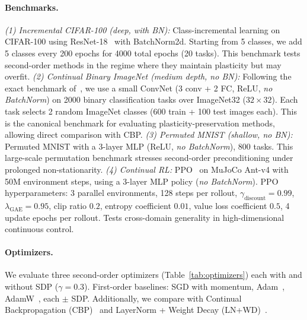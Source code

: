 \documentclass{article}
\begin{document}
\paragraph{Benchmarks.}
\emph{(1) Incremental CIFAR-100 (deep, with BN):} Class-incremental learning on CIFAR-100 using ResNet-18~\citep{he2016deep} with BatchNorm2d. Starting from 5 classes, we add 5 classes every 200 epochs for 4000 total epochs (20 tasks). This benchmark tests second-order methods in the regime where they maintain plasticity but may overfit.
\emph{(2) Continual Binary ImageNet (medium depth, no BN):} Following the exact benchmark of~\citet{dohare2024loss}, we use a small ConvNet (3 conv + 2 FC, ReLU, \emph{no BatchNorm}) on 2000 binary classification tasks over ImageNet32 ($32{\times}32$). Each task selects 2 random ImageNet classes (600 train + 100 test images each). This is the canonical benchmark for evaluating plasticity-preservation methods, allowing direct comparison with CBP.
\emph{(3) Permuted MNIST (shallow, no BN):} Permuted MNIST with a 3-layer MLP (ReLU, \emph{no BatchNorm}), 800 tasks. This large-scale permutation benchmark stresses second-order preconditioning under prolonged non-stationarity.
\emph{(4) Continual RL:} PPO~\citep{schulman2017proximal} on MuJoCo Ant-v4 with 50M environment steps, using a 3-layer MLP policy (\emph{no BatchNorm}). PPO hyperparameters: 3 parallel environments, 128 steps per rollout, $\gamma_{\mathrm{discount}} = 0.99$, $\lambda_{\mathrm{GAE}} = 0.95$, clip ratio $0.2$, entropy coefficient $0.01$, value loss coefficient $0.5$, 4 update epochs per rollout. Tests cross-domain generality in high-dimensional continuous control.

\paragraph{Optimizers.} We evaluate three second-order optimizers (Table~\ref{tab:optimizers}) each with and without SDP ($\gamma = 0.3$). First-order baselines: SGD with momentum, Adam~\citep{kingma2015adam}, AdamW~\citep{loshchilov2019adamw}, each $\pm$ SDP. Additionally, we compare with Continual Backpropagation (CBP)~\citep{dohare2024loss} and LayerNorm + Weight Decay (LN+WD)~\citep{lyle2025disentangling}.
\end{document}
